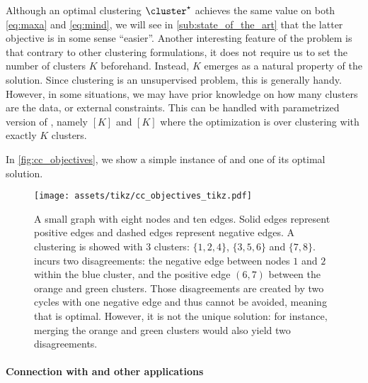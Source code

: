 Although an optimal clustering $\cluster^\star$ achieves the same value on both \eqref{eq:maxa}
and \eqref{eq:mind}, we will see in \autoref{sub:state_of_the_art} that the latter objective is in
some sense \enquote{easier}. Another interesting feature of the \pcc{} problem is that contrary to
other clustering formulations, it does not require us to set the number of clusters $K$ beforehand.
Instead, $K$ emerges as a natural property of the solution. Since clustering is an unsupervised
problem, this is generally handy. However, in some situations, we may have prior knowledge on how
many clusters are the data, or external constraints. This can be handled with parametrized version
of \pcc{}, namely \maxa$[K]$ and \mind$[K]$ where the optimization is over clustering with exactly
$K$ clusters.

In \autoref{fig:cc_objectives}, we show a simple instance of \pcc{} and one of its optimal solution.
\begin{figure}[hbt]
	\centering
	\texttt{[image: assets/tikz/cc\_objectives\_tikz.pdf]}
	\caption[Small example of \pcc{}]{A small graph with eight nodes and ten edges. Solid edges
	represent positive edges and dashed edges represent negative edges. A clustering \cluster{}
	is showed with 3 clusters: $\{1, 2, 4\}$, $\{3, 5, 6\}$ and $\{7, 8\}$. \cluster{} incurs two
	disagreements: the negative edge between nodes $1$ and $2$ within the blue cluster, and the
	positive edge $(6,7)$ between the orange and green clusters. Those disagreements are created
	by two cycles with one negative edge and thus cannot be avoided, meaning that \cluster{} is
	optimal. However, it is not the unique solution: for instance, merging the orange and green
	clusters would also yield two disagreements.}
	\label{fig:cc_objectives}
\end{figure}

\paragraph{Connection with \esp{} and other applications}
\label{ssub:cc_applications}

